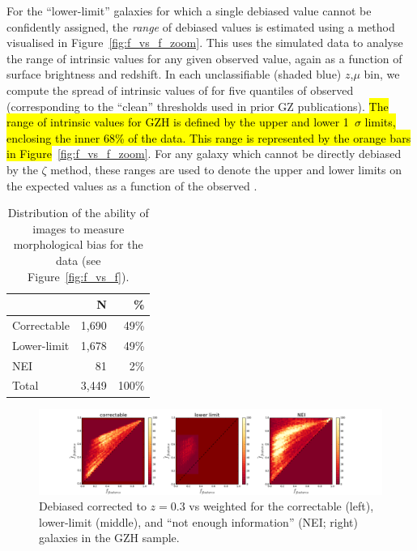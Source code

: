 \documentclass[a4paper,fleqn,usenatbib]{mnras}
\begin{document}
For the ``lower-limit'' galaxies for which a single debiased \ffeatures{} value
cannot be confidently assigned, the \emph{range} of debiased values is
estimated using a method visualised in Figure~\ref{fig:f_vs_f_zoom}. This uses the
\ferengi{} simulated data to analyse the range of intrinsic \ffeaturesrest{}
values for any given observed \ffeatures{} value, again as a function of
surface brightness and redshift. In each unclassifiable (shaded blue) $z$,$\mu$ bin, 
we compute the spread of
intrinsic values of \ffeaturesrest{} for five quantiles of observed \ffeatures{}
(corresponding to the ``clean'' thresholds used in prior GZ publications).
\hl{The range of intrinsic values for GZH is defined by the upper and lower 1~$\sigma$ limits,
enclosing the inner 68\% of the data. This range is represented by the orange bars in 
Figure}~\ref{fig:f_vs_f_zoom}. For any galaxy which
cannot be directly debiased by the $\zeta$ method, these ranges are used to
denote the upper and lower limits on the expected values \ffeaturesrest{} as a
function of the observed \ffeatures. 

\begin{table}
\center
\caption{Distribution of the ability of images to measure
morphological bias for
the \ferengi{} data (see Figure~\ref{fig:f_vs_f}).}
\label{tbl:ferengi_corrections}
\begin{tabular}{lrr}
\hline \hline
                                   & N       & \% \\
\hline 
Correctable                        & 1,690   &  49\% \\
Lower-limit                        & 1,678   &  49\% \\
NEI                                & 81      &   2\%\\
Total                              & 3,449   & 100\% \\
\hline \hline
\end{tabular}
\end{table}

\begin{figure}
\center
\includegraphics[width=\textwidth]{figures/debiased_corrections.pdf}
\caption{Debiased \ffeatures{} corrected to $z=0.3$ vs weighted \ffeatures{}
for the correctable (left), lower-limit (middle), and ``not enough
information'' (NEI; right) galaxies in the GZH sample.}
\label{fig:debiased_corrections}
\end{figure}
\end{document}
